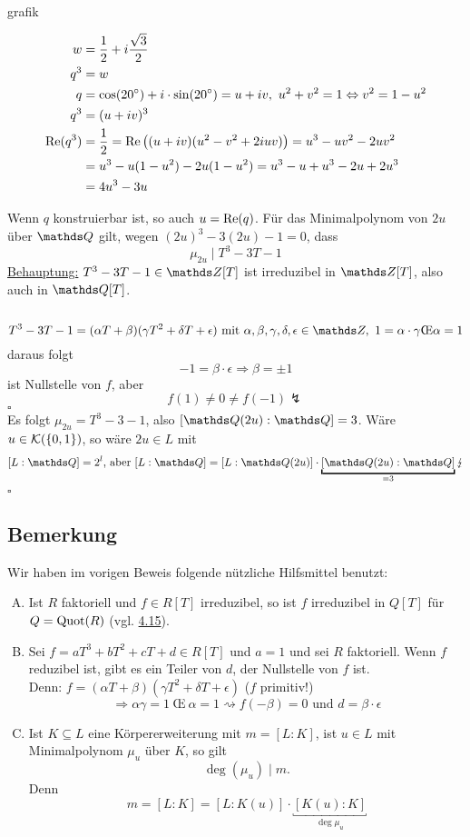 \\
\begin{minipage}{4cm}
	grafik
\end{minipage}
\begin{minipage}{8cm}
	\begin{equation*}
	\begin{aligned}
		w&=\frac{1}{2}+i\frac{\sqrt{3}}{2}\\
		q^3&=w\\
		q&= \cos(20^\circ)+i\cdot \sin(20^\circ)=u+iv,~u^2+v^2=1\Leftrightarrow v^2=1-u^2\\
		q^3&=(u+iv)^3\\
		\operatorname{Re}(q^3)&=\frac{1}{2}=\operatorname{Re} \big((u+iv)(u^2-v^2+2iuv) \big)=u^3-uv^2-2uv^2\\
		&=u^3-u(1-u^2)-2u(1-u^2)=u^3-u+u^3-2u+2u^3\\
		&=4u^3-3u
	\end{aligned}
	\end{equation*}
\end{minipage}

Wenn $q$ konstruierbar ist, so auch $u=\operatorname{Re}(q)$.
Für das Minimalpolynom von $2u$ über $\Q$ gilt, wegen $(2u)^3-3(2u)-1=0$, dass
\[
\mu_{2u}\mid T^3-3T-1
\]
\uline{Behauptung:} $T^3-3T-1\in \Z[T]$ ist irreduzibel in $\Z[T]$, also auch in $\Q[T]$.\\
\\
\[
T^3-3T-1=(\alpha T+\beta)(\gamma T^2+\delta T+\epsilon)\text{ mit } \alpha,\beta,\gamma,\delta,\epsilon\in \Z,~1=\alpha\cdot \gamma \text{\OE} \alpha=1
\]
daraus folgt
\[
-1=\beta\cdot\epsilon\Rightarrow \beta=\pm 1
\]
ist Nullstelle von $f$, aber
\[
f(1)\neq 0\neq f(-1)\lightning
\]
\hfill $\square$\\

Es folgt $\mu_{2u}=T^3-3-1$, also $[\Q(2u):\Q]=3$.
Wäre$u\in \mathcal{K}(\{0,1\})$, so wäre $2u\in L$ mit 
\[
[L:\Q]=2^l\text{, aber } [L:\Q]=[L:\Q(2u)]\cdot\underbracket{[\Q(2u):\Q]}_{=3}\lightning
\]
\hfill $\square$

\subsection{Bemerkung}
\label{sub:bemerkung}
Wir haben im vorigen Beweis folgende nützliche Hilfsmittel benutzt:
\begin{enumerate}[(A)]
	\item Ist $R$ faktoriell und $f\in R[T]$ irreduzibel, so ist $f$ irreduzibel in $Q[T]$ für $Q=\operatorname{Quot}(R)$ (vgl. \hyperref[sub:satz_18]{4.15}).
	\item Sei $f=aT^3+bT^2+cT+d\in R[T]$ und $a=1$ und sei $R$ faktoriell.
	Wenn $f$ reduzibel ist, gibt es ein Teiler von $d$, der Nullstelle von $f$ ist.\\
	Denn: $f=(\alpha T+\beta)(\gamma T^2+\delta T+\epsilon)$ ($f$ primitiv!)
	\[
	\Rightarrow \alpha\gamma=1 ~ \text{\OE} ~\alpha=1\rightsquigarrow f(-\beta)=0\text{ und } d=\beta\cdot \epsilon
	\]
	\item Ist $K\subseteq L$ eine Körpererweiterung mit $m=[L:K]$, ist $u\in L$ mit Minimalpolynom $\mu_u$ über $K$, so gilt
	\[
	\deg(\mu_u)\mid m.
	\]
	Denn
	\[
	m=[L:K]=[L:K(u)]\cdot \underbracket{[K(u):K]}_{\deg \mu_u}
	\]
\end{enumerate}
\newpage
